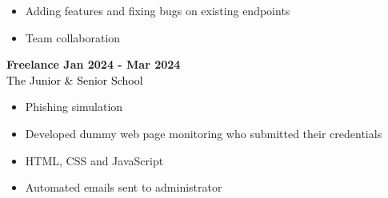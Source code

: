 \documentclass[12pt]{article}
\begin{document}
\begin{paracol}{2}
{\begin{itemize}[leftmargin=13pt, itemsep=0pt, topsep=0pt]
         \item Adding features and fixing bugs on existing endpoints\\
         \item Team collaboration\\
      \end{itemize}
   }
   \vspace{0.5cm}
   \textbf{\textcolor{bgcolor}{Freelance \hfill Jan 2024 - Mar 2024}}\\[0.5em]
   \textcolor{black}{The Junior \& Senior School}\\[0.5em]
   {\renewcommand{\labelitemi}{\textcolor{bgcolor}{\normalsize$\bullet$}}%
   \begin{itemize}[leftmargin=13pt, itemsep=0pt, topsep=0pt]
         \item Phishing simulation\\
         \item Developed dummy web page monitoring who submitted their credentials\\
         \item HTML, CSS and JavaScript\\
         \item Automated emails sent to administrator\\
      \end{itemize}
   }
\end{paracol}
\end{document}
